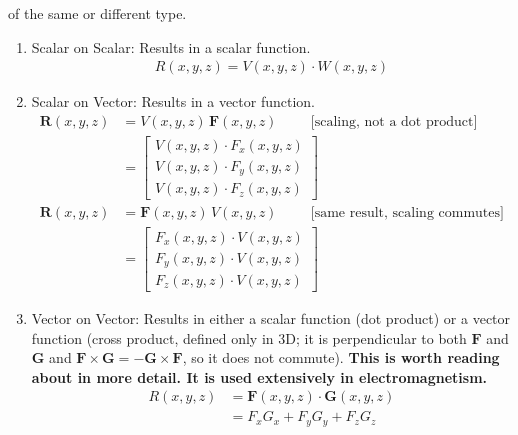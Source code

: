 \begin{enumerate}
    of the same or different type.
    \begin{enumerate}
    \item Scalar on Scalar: Results in a scalar function.
      \begin{align*}
      R(x, y, z) = V(x, y, z) \cdot W(x, y, z)
      \end{align*}
    \item Scalar on Vector: Results in a vector function.
      \begin{align*}
        \mathbf{R}(x, y, z) &= V(x, y, z)\, \mathbf{F}(x, y, z) \hspace{1cm} \text{[scaling, not a dot product]} \\
                             &= \begin{bmatrix}
                                  V(x, y, z) \cdot F_x(x, y, z) \\
                                  V(x, y, z) \cdot F_y(x, y, z) \\
                                  V(x, y, z) \cdot F_z(x, y, z)
                                \end{bmatrix} \\
        \mathbf{R}(x, y, z) &= \mathbf{F}(x, y, z)\, V(x, y, z) \hspace{1cm} \text{[same result, scaling commutes]} \\
                             &= \begin{bmatrix}
                                  F_x(x, y, z) \cdot V(x, y, z) \\
                                  F_y(x, y, z) \cdot V(x, y, z) \\
                                  F_z(x, y, z) \cdot V(x, y, z)
                                \end{bmatrix}
      \end{align*}
    \item Vector on Vector: Results in either a scalar function
      (dot product) or a vector function (cross product, defined only in
      3D; it is perpendicular to both \(\mathbf{F}\) and \(\mathbf{G}\) and
      \(\mathbf{F} \times \mathbf{G} = -\mathbf{G} \times \mathbf{F}\), so it does not commute). \textbf{This
      is worth reading about in more detail. It is used extensively
      in electromagnetism.}
      \begin{align*}
        R(x, y, z) &= \mathbf{F}(x, y, z) \cdot \mathbf{G}(x, y, z) \\
                   &= F_x G_x + F_y G_y + F_z G_z

\end{align*}
\end{enumerate}
\end{enumerate}
